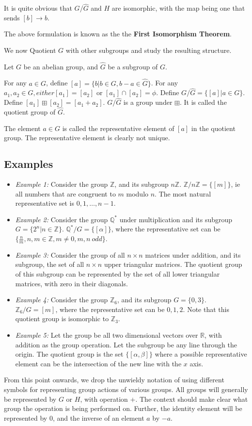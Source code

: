 It is quite obvious that $G \big/ \widehat{G}$ and $H$ are isomorphic, with the map being one that sends $[b] \rightarrow b$.
\par
The above formulation is known as the the \textbf{First Isomorphism Theorem}.
\par
We now Quotient $G$ with other subgroups and study the resulting structure.
\par
Let $G$ be an abelian group, and $\widehat{G}$ be a subgroup of $G$.
\par
For any $a \in G$, define $[a] = \{ b | b \in G, b - a \in \widehat{G} \}$.
For any $a_{1}, a_{2} \in G, either [a_{1}] = [a_{2}]$ or $[a_{1}] \cap [a_{2}] = \phi$.
Define $G \Big/ \widehat{G} = \{ [a] | a \in G \}$.
Define $[a_{1}] \boxplus [a_{2}] = [a_{1} + a_{2}]$.
$G \Big/ \widehat{G}$ is a group under $\boxplus$.
It is called the quotient group of $\widehat{G}$.
\par
The element $a \in G$ is called the representative element of $[a]$ in the quotient group.
The representative element is clearly not unique.
\subsection{Examples}
\begin{itemize}
  \item \emph{Example 1:} Consider the group $\mathbb{Z}$, and its subgroup $n \mathbb{Z}$. $\mathbb{Z} \Big/ n \mathbb{Z} = \{ [m] \}$, ie all numbers that are congruent to $m$ modulo $n$.
    The most natural representative set is ${0, 1, \dots , n-1}$.
  \item \emph{Example 2:} Consider the group $\mathbb{Q}^{*}$ under multiplication and its subgroup $G = \{ 2^{n} | n \in \mathbb{Z} \}$.
    $\mathbb{Q}^{*} \Big/ G = \{ [\alpha] \}$, where the representative set can be $ \{ \frac{n}{m} , n, m \in \mathbb{Z} , m \neq 0, m, n \ odd \}$.
  \item \emph{Example 3:} Consider the group of all $n \times n$ matrices under addition, and its subgroup, the set of all $n \times n$ upper triangular matrices.
    The quotient group of this subgroup can be represented by the set of all lower triangular matrices, with zero in their diagonals.
  \item \emph{Example 4:} Consider the group $\mathbb{Z}_{6}$, and its subgroup $G = \{ 0, 3 \} $.
    $\mathbb{Z}_{6} \Big/ G = {[m]}$, where the representative set can be ${0, 1, 2}$.
    Note that this quotient group is isomorphic to $\mathbb{Z}_{3}$.
  \item \emph{Example 5:} Let the group be all two dimensional vectors over $\mathbb{R}$, with addition as the group operation.
    Let the subgroup be any line through the origin.
    The quotient group is the set $ \{ [\alpha, \beta ]\}$ where a possible representative element can be the intersection of the new line with the $x$ axis.
\end{itemize}
From this point onwards, we drop the unwieldy notation of using different symbols for representing group actions of various groups.
All groups will generally be represented by $G$ or $H$, with operation $+$.
The context should make clear what group the operation is being performed on.
Further, the identity element will be represented by $0$, and the inverse of an element $a$ by $-a$.
